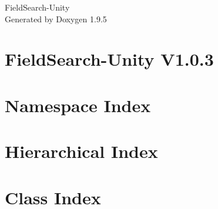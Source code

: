 \documentclass[twoside]{book}
\newcommand{\+}{\discretionary{\mbox{\scriptsize$\hookleftarrow$}}{}{}}
\newcommand{\clearemptydoublepage}{%
    \newpage{\pagestyle{empty}\cleardoublepage}%
  }
\begin{document}
  \raggedbottom
    \hypersetup{pageanchor=false,
                bookmarksnumbered=true,
                pdfencoding=unicode
               }
  \begin{titlepage}
  \vspace*{7cm}
  \begin{center}%
  {\Large Field\+Search-\/\+Unity}\\
  \vspace*{1cm}
  {\large Generated by Doxygen 1.9.5}\\
  \end{center}
  \end{titlepage}
  \clearemptydoublepage
  \tableofcontents
  \clearemptydoublepage
  \hypersetup{pageanchor=true}
\chapter{Field\+Search-\/\+Unity V1.0.3}
\label{index}\hypertarget{index}{}
\chapter{Namespace Index}

\chapter{Hierarchical Index}

\chapter{Class Index}

\end{document}
